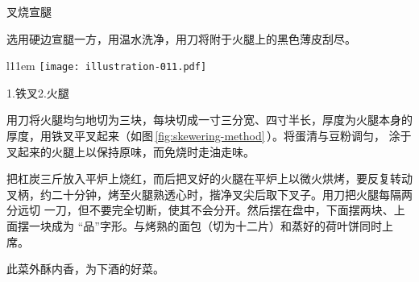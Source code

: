 \begin{recipe}{叉烧宣腿}

\ingredients


\preparation

\step 选用硬边宣腿一方，用温水洗净，用刀将附于火腿上的黑色薄皮刮尽。

\begin{wrapfigure}[13]{l}{11em}%
\centering%
\vspace{-.75\baselineskip}%
\texttt{[image: illustration-011.pdf]}%
\vspace{-.4375\baselineskip}%
\caption{叉烧宣腿叉法}
\label{fig:skewering-method}%
\begingroup%
\small%
\noindent%
\null\hspace{0em}1.铁叉\hspace{1em}2.火腿
\endgroup%
\end{wrapfigure}

\step 用刀将火腿均匀地切为三块，每块切成一寸三分宽、四寸半长，厚度为火腿本身的
厚度，用铁叉平叉起来（如图\,\ref{fig:skewering-method}\,）。将蛋清与豆粉调匀，
涂于叉起来的火腿上以保持原味，而免烧时走油走味。

\step 把杠炭三斤放入平炉上烧红，而后把叉好的火腿在平炉上以微火烘烤，要反复转动
叉柄，约二十分钟，烤至火腿熟透心时，揩净叉尖后取下叉子。用刀把火腿每隔两分远切
一刀，但不要完全切断，使其不会分开。然后摆在盘中，下面摆两块、上面摆一块成为
“品”字形。与烤熟的面包（切为十二片）和蒸好的荷叶饼同时上席。

\features

此菜外酥内香，为下酒的好菜。

\end{recipe}

